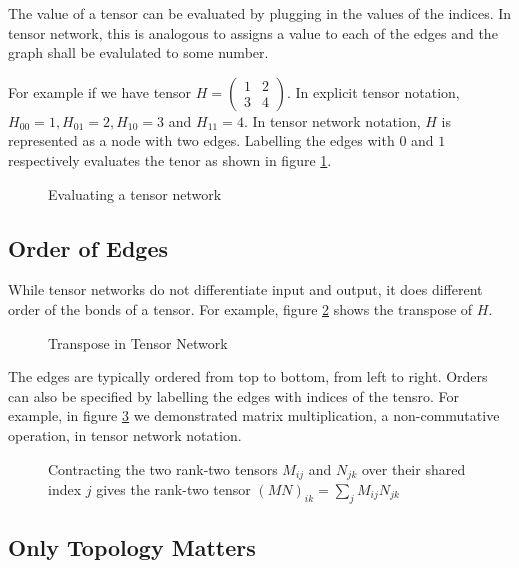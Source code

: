 The value of a tensor can be evaluated by plugging in the values of the indices. 
In tensor network, this is analogous to assigns a value to each of the edges and the graph shall be evalulated to some number. 

For example if we have tensor $H = \begin{pmatrix}
	1 & 2 \\
	3 & 4
\end{pmatrix} $. In explicit tensor notation, $H_{00} = 1, H_{01} = 2,  H_{10} = 3$ and $H_{11} = 4$.
In tensor network notation, $H$ is represented as a node with two edges. Labelling the edges with $0$ and $1$ respectively evaluates the tenor as shown in figure \ref{fig:tensor-net-eval}.

\begin{figure}[ht]
	\centering
	
	\caption{Evaluating a tensor network}
	\label{fig:tensor-net-eval}
\end{figure}
\subsection{Order of Edges}


While tensor networks do not differentiate input and output, it does different order of the bonds of a tensor. 
For example, figure \ref{fig:tensor-transpose} shows the transpose of $H$.
\begin{figure}[ht]
	\centering
	
	\caption{Transpose in Tensor Network}
	\label{fig:tensor-transpose}
\end{figure}


The edges are typically ordered from top to bottom, from left to right. 
Orders can also be specified by labelling the edges with indices of the tensro. 
For example, in figure \ref{fig:contraction-matrix-mult} we demonstrated matrix multiplication, a non-commutative operation, in tensor network notation.

\begin{figure}[ht]
	\centering
	
\caption{Contracting the two rank-two tensors $M_{ij}$ and $N_{jk}$ over their shared index $j$ gives the rank-two tensor $(MN)_{ik} = \sum_j M_{ij} N_{jk}$}
	\label{fig:contraction-matrix-mult}
\end{figure}

\subsection{Only Topology Matters}

